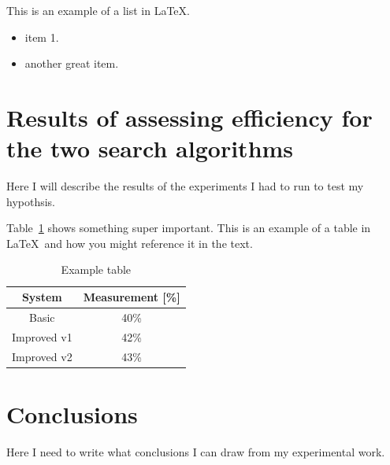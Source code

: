 \documentclass[11pt,oneside]{article}
\begin{document}
This is an example of a list in \LaTeX. 

\begin{itemize}
    \item item 1.
    \item another great item.
\end{itemize}

\section{Results of assessing efficiency for the two search algorithms}

Here I will describe the results of the experiments I had to run to test my hypothsis.

Table~\ref{tab:my_label} shows something super important. This is an example of a table in \LaTeX\ and how you might reference it in the text.

\begin{table}[ht]
    \centering
    \begin{tabular}{|c|c|}
        System      & Measurement [\%] \\ \hline
        Basic       & 40\% \\
        Improved v1 & 42\% \\
        Improved v2 & 43\% \\
    \end{tabular}
    \caption{Example table}
    \label{tab:my_label}
\end{table}

 
\section{Conclusions}

Here I need to write what conclusions I can draw from my experimental work.
\end{document}
